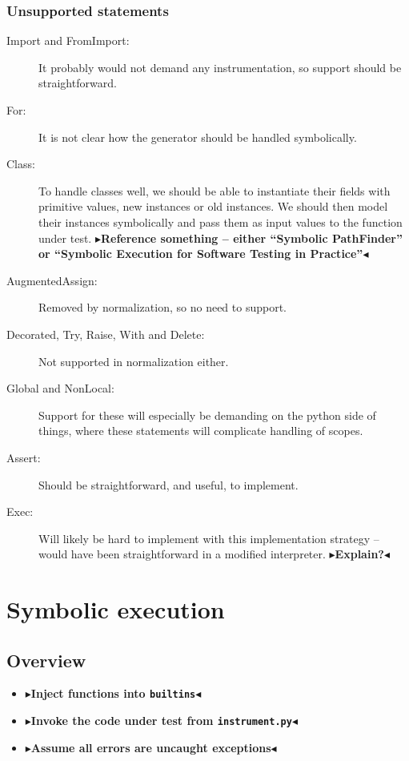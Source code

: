 \documentclass[11pt]{report}
\newcommand{\todo}[1]{{\color[rgb]{.5,0,0}\textbf{$\blacktriangleright$#1$\blacktriangleleft$}}}
\begin{document}
\subsection{Unsupported statements}
\begin{description}
  \item[Import and FromImport:] It probably would not demand any
    instrumentation, so support should be straightforward.
  \item[For:] It is not clear how the generator should be handled
    symbolically.
  \item[Class:] To handle classes well, we should be able to
    instantiate their fields with primitive values, new instances or
    old instances. We should then model their instances symbolically
    and pass them as input values to the function under
    test. \todo{Reference something -- either ``Symbolic PathFinder''
      or ``Symbolic Execution for Software Testing in Practice''}
  \item[AugmentedAssign:] Removed by normalization, so no need to
    support.
  \item[Decorated, Try, Raise, With and Delete:] Not supported in
    normalization either.
  \item[Global and NonLocal:] Support for these will especially be
    demanding on the python side of things, where these statements
    will complicate handling of scopes.
  \item[Assert:] Should be straightforward, and useful, to implement.
  \item[Exec:] Will likely be hard to implement with this
    implementation strategy -- would have been straightforward in a
    modified interpreter. \todo{Explain?}
\end{description}

\chapter{Symbolic execution}
\label{ch:symbolic}

\section{Overview}

\begin{itemize}
\item \todo{Inject functions into \verb|builtins|}
\item \todo{Invoke the code under test from \verb|instrument.py|}
\item \todo{Assume all errors are uncaught exceptions}
\end{itemize}
\end{document}
